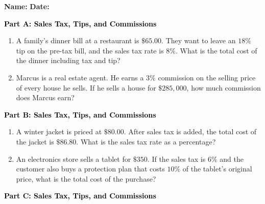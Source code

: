 \documentclass[12pt, letterpaper, fleqn]{article}
\begin{document}
\textbf{Name:} \underline{\hspace{5cm}}
\hfill
\textbf{Date:} \underline{\hspace{3cm}}\\

\begin{tcolorbox}[colback=customteal!20]
\large\textcolor{black}{\textbf{Part A: Sales Tax, Tips, and Commissions}}
\end{tcolorbox}

\vspace{3mm}

\begin{enumerate}[itemsep=5.5cm, leftmargin=0.6cm]
\item A family's dinner bill at a restaurant is $\$65.00$. They want to leave an $18\%$ tip on the pre-tax bill, and the sales tax rate is $8\%$. What is the total cost of the dinner including tax and tip?
\item Marcus is a real estate agent. He earns a $3\%$ commission on the selling price of every house he sells. If he sells a house for $\$285,000$, how much commission does Marcus earn?
\end{enumerate}

\newpage

\begin{tcolorbox}[colback=customteal!20]
\large\textcolor{black}{\textbf{Part B: Sales Tax, Tips, and Commissions}}
\end{tcolorbox}

\vspace{3mm}

\begin{enumerate}[itemsep=5.5cm, leftmargin=0.6cm, resume]
\item A winter jacket is priced at $\$80.00$. After sales tax is added, the total cost of the jacket is $\$86.80$. What is the sales tax rate as a percentage?
\item An electronics store sells a tablet for $\$350$. If the sales tax is $6\%$ and the customer also buys a protection plan that costs $10\%$ of the tablet's original price, what is the total cost of the purchase?
\end{enumerate}

\newpage

\begin{tcolorbox}[colback=customteal!20]
\large\textcolor{black}{\textbf{Part C: Sales Tax, Tips, and Commissions}}
\end{tcolorbox}
\end{document}
